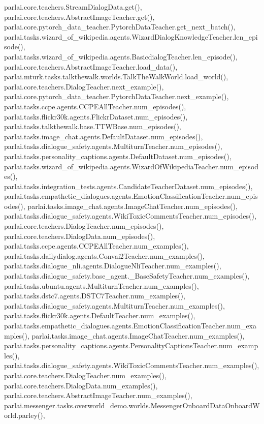 parlai.\+core.\+teachers.\+Stream\+Dialog\+Data.\+get(), parlai.\+core.\+teachers.\+Abstract\+Image\+Teacher.\+get(), parlai.\+core.\+pytorch\+\_\+data\+\_\+teacher.\+Pytorch\+Data\+Teacher.\+get\+\_\+next\+\_\+batch(), parlai.\+tasks.\+wizard\+\_\+of\+\_\+wikipedia.\+agents.\+Wizard\+Dialog\+Knowledge\+Teacher.\+len\+\_\+episode(), parlai.\+tasks.\+wizard\+\_\+of\+\_\+wikipedia.\+agents.\+Basicdialog\+Teacher.\+len\+\_\+episode(), parlai.\+core.\+teachers.\+Abstract\+Image\+Teacher.\+load\+\_\+data(), parlai.\+mturk.\+tasks.\+talkthewalk.\+worlds.\+Talk\+The\+Walk\+World.\+load\+\_\+world(), parlai.\+core.\+teachers.\+Dialog\+Teacher.\+next\+\_\+example(), parlai.\+core.\+pytorch\+\_\+data\+\_\+teacher.\+Pytorch\+Data\+Teacher.\+next\+\_\+example(), parlai.\+tasks.\+ccpe.\+agents.\+C\+C\+P\+E\+All\+Teacher.\+num\+\_\+episodes(), parlai.\+tasks.\+flickr30k.\+agents.\+Flickr\+Dataset.\+num\+\_\+episodes(), parlai.\+tasks.\+talkthewalk.\+base.\+T\+T\+W\+Base.\+num\+\_\+episodes(), parlai.\+tasks.\+image\+\_\+chat.\+agents.\+Default\+Dataset.\+num\+\_\+episodes(), parlai.\+tasks.\+dialogue\+\_\+safety.\+agents.\+Multiturn\+Teacher.\+num\+\_\+episodes(), parlai.\+tasks.\+personality\+\_\+captions.\+agents.\+Default\+Dataset.\+num\+\_\+episodes(), parlai.\+tasks.\+wizard\+\_\+of\+\_\+wikipedia.\+agents.\+Wizard\+Of\+Wikipedia\+Teacher.\+num\+\_\+episodes(), parlai.\+tasks.\+integration\+\_\+tests.\+agents.\+Candidate\+Teacher\+Dataset.\+num\+\_\+episodes(), parlai.\+tasks.\+empathetic\+\_\+dialogues.\+agents.\+Emotion\+Classification\+Teacher.\+num\+\_\+episodes(), parlai.\+tasks.\+image\+\_\+chat.\+agents.\+Image\+Chat\+Teacher.\+num\+\_\+episodes(), parlai.\+tasks.\+dialogue\+\_\+safety.\+agents.\+Wiki\+Toxic\+Comments\+Teacher.\+num\+\_\+episodes(), parlai.\+core.\+teachers.\+Dialog\+Teacher.\+num\+\_\+episodes(), parlai.\+core.\+teachers.\+Dialog\+Data.\+num\+\_\+episodes(), parlai.\+tasks.\+ccpe.\+agents.\+C\+C\+P\+E\+All\+Teacher.\+num\+\_\+examples(), parlai.\+tasks.\+dailydialog.\+agents.\+Convai2\+Teacher.\+num\+\_\+examples(), parlai.\+tasks.\+dialogue\+\_\+nli.\+agents.\+Dialogue\+Nli\+Teacher.\+num\+\_\+examples(), parlai.\+tasks.\+dialogue\+\_\+safety.\+base\+\_\+agent.\+\_\+\+Base\+Safety\+Teacher.\+num\+\_\+examples(), parlai.\+tasks.\+ubuntu.\+agents.\+Multiturn\+Teacher.\+num\+\_\+examples(), parlai.\+tasks.\+dstc7.\+agents.\+D\+S\+T\+C7\+Teacher.\+num\+\_\+examples(), parlai.\+tasks.\+dialogue\+\_\+safety.\+agents.\+Multiturn\+Teacher.\+num\+\_\+examples(), parlai.\+tasks.\+flickr30k.\+agents.\+Default\+Teacher.\+num\+\_\+examples(), parlai.\+tasks.\+empathetic\+\_\+dialogues.\+agents.\+Emotion\+Classification\+Teacher.\+num\+\_\+examples(), parlai.\+tasks.\+image\+\_\+chat.\+agents.\+Image\+Chat\+Teacher.\+num\+\_\+examples(), parlai.\+tasks.\+personality\+\_\+captions.\+agents.\+Personality\+Captions\+Teacher.\+num\+\_\+examples(), parlai.\+tasks.\+dialogue\+\_\+safety.\+agents.\+Wiki\+Toxic\+Comments\+Teacher.\+num\+\_\+examples(), parlai.\+core.\+teachers.\+Dialog\+Teacher.\+num\+\_\+examples(), parlai.\+core.\+teachers.\+Dialog\+Data.\+num\+\_\+examples(), parlai.\+core.\+teachers.\+Abstract\+Image\+Teacher.\+num\+\_\+examples(), parlai.\+messenger.\+tasks.\+overworld\+\_\+demo.\+worlds.\+Messenger\+Onboard\+Data\+Onboard\+World.\+parley(), 